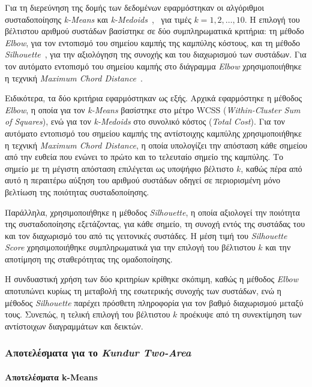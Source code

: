 \documentclass[conference]{IEEEtran}
\begin{document}
Για τη διερεύνηση της δομής των δεδομένων εφαρμόστηκαν οι αλγόριθμοι συσταδοποίησης \textit{k-Means} και \textit{k-Medoids}~\cite{macqueen1967some},~\cite{kaufman2009finding} για τιμές \(k = 1,2,\ldots,10\). Η επιλογή του βέλτιστου αριθμού συστάδων βασίστηκε σε δύο συμπληρωματικά κριτήρια: τη μέθοδο \textit{Elbow}, για τον εντοπισμό του σημείου καμπής της καμπύλης κόστους, και τη μέθοδο \textit{Silhouette}~\cite{ROUSSEEUW198753}, για την αξιολόγηση της συνοχής και του διαχωρισμού των συστάδων. Για τον αυτόματο εντοπισμό του σημείου καμπής στο διάγραμμα \textit{Elbow} χρησιμοποιήθηκε η τεχνική \textit{Maximum Chord Distance}~\cite{Satopaa2011Kneedle}.

Ειδικότερα, τα δύο κριτήρια εφαρμόστηκαν ως εξής. Αρχικά εφαρμόστηκε η μέθοδος \textit{Elbow}, η οποία για τον \textit{k-Means} βασίστηκε στο μέτρο WCSS (\textit{Within-Cluster Sum of Squares}), ενώ για τον \textit{k-Medoids} στο συνολικό κόστος (\textit{Total Cost}). Για τον αυτόματο εντοπισμό του σημείου καμπής της αντίστοιχης καμπύλης χρησιμοποιήθηκε η τεχνική \textit{Maximum Chord Distance}, η οποία υπολογίζει την απόσταση κάθε σημείου από την ευθεία που ενώνει το πρώτο και το τελευταίο σημείο της καμπύλης. Το σημείο με τη μέγιστη απόσταση επιλέγεται ως υποψήφιο βέλτιστο \(k\), καθώς πέρα από αυτό η περαιτέρω αύξηση του αριθμού συστάδων οδηγεί σε περιορισμένη μόνο βελτίωση της ποιότητας συσταδοποίησης.

Παράλληλα, χρησιμοποιήθηκε η μέθοδος \textit{Silhouette}, η οποία αξιολογεί την ποιότητα της συσταδοποίησης εξετάζοντας, για κάθε σημείο, τη συνοχή εντός της συστάδας του και τον διαχωρισμό του από τις γειτονικές συστάδες. Η μέση τιμή του \textit{Silhouette Score} χρησιμοποιήθηκε συμπληρωματικά για την επιλογή του βέλτιστου \(k\) και την αποτίμηση της σταθερότητας της ομαδοποίησης.

Η συνδυαστική χρήση των δύο κριτηρίων κρίθηκε σκόπιμη, καθώς η μέθοδος \textit{Elbow} αποτυπώνει κυρίως τη μεταβολή της εσωτερικής συνοχής των συστάδων, ενώ η μέθοδος \textit{Silhouette} παρέχει πρόσθετη πληροφορία για τον βαθμό διαχωρισμού μεταξύ τους. Συνεπώς, η τελική επιλογή του βέλτιστου \(k\) προέκυψε από τη συνεκτίμηση των αντίστοιχων διαγραμμάτων και δεικτών.

\subsubsection{Αποτελέσματα για το \textit{Kundur Two-Area}}
\paragraph{Αποτελέσματα k-Means}
\end{document}

